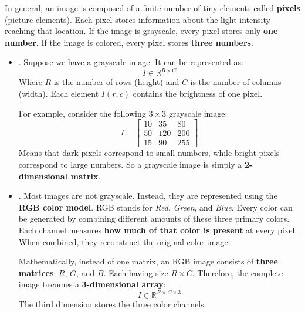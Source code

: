 \highspace
In general, an image is composed of a finite number of tiny elements called \textbf{pixels} (picture elements). Each pixel stores information about the light intensity reaching that location. If the image is grayscale, every pixel stores only \textbf{one number}. If the image is colored, every pixel stores \textbf{three numbers}.
\begin{itemize}
    \item {}. Suppose we have a grayscale image. It can be represented as:
    \begin{equation*}
        I \in \mathbb{R}^{R \times C}
    \end{equation*}
    Where $R$ is the number of rows (height) and $C$ is the number of columns (width). Each element $I\left(r,c\right)$ contains the brightness of one pixel.

    For example, consider the following $3 \times 3$ grayscale image:
    \begin{equation*}
        I = \begin{bmatrix}
            10 & 35 & 80 \\
            50 & 120 & 200 \\
            15 & 90 & 255
        \end{bmatrix}
    \end{equation*}
    Means that dark pixels correspond to small numbers, while bright pixels correspond to large numbers. So a grayscale image is simply a \textbf{2-dimensional matrix}.


    \item {}. Most images are not grayscale. Instead, they are represented using the \textbf{RGB color model}. RGB stands for \emph{Red}, \emph{Green}, and \emph{Blue}. Every color can be generated by combining different amounts of these three primary colors. Each channel measures \textbf{how much of that color is present} at every pixel. When combined, they reconstruct the original color image.
    
    Mathematically, instead of one matrix, an RGB image consists of \textbf{three matrices}: $R$, $G$, and $B$. Each having size $R \times C$. Therefore, the complete image becomes a \textbf{3-dimensional array}:
    \begin{equation*}
        I \in \mathbb{R}^{R \times C \times 3}
    \end{equation*}
    The third dimension stores the three color channels.
\end{itemize}

